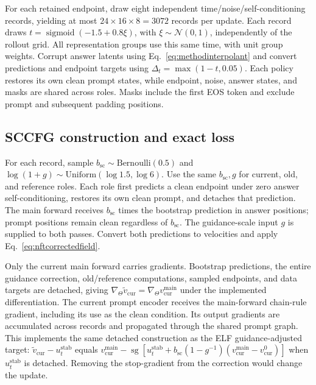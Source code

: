 \documentclass[11pt,letterpaper]{article}
\newcommand{\sg}{\operatorname{sg}}
\begin{document}
For each retained endpoint, draw eight independent time/noise/self-conditioning records, yielding at most $24\times16\times8=3072$ records per update. Each record draws $t=\operatorname{sigmoid}(-1.5+0.8\xi)$, with $\xi\sim\mathcal N(0,1)$, independently of the rollout grid. All representation groups use this same time, with unit group weights. Corrupt answer latents using Eq.~\eqref{eq:methodinterpolant} and convert predictions and endpoint targets using $\Delta_t=\max(1-t,0.05)$. Each policy restores its own clean prompt states, while endpoint, noise, answer states, and masks are shared across roles. Masks include the first EOS token and exclude prompt and subsequent padding positions.

\subsection{SCCFG construction and exact loss}

For each record, sample $b_{\mathrm{sc}}\sim\mathrm{Bernoulli}(0.5)$ and $\log(1+g)\sim\mathrm{Uniform}(\log1.5,\log6)$. Use the same $b_{\mathrm{sc}},g$ for current, old, and reference roles. Each role first predicts a clean endpoint under zero answer self-conditioning, restores its own clean prompt, and detaches that prediction. The main forward receives $b_{\mathrm{sc}}$ times the bootstrap prediction in answer positions; prompt positions remain clean regardless of $b_{\mathrm{sc}}$. The guidance-scale input $g$ is supplied to both passes. Convert both predictions to velocities and apply Eq.~\eqref{eq:nftcorrectedfield}.

Only the current main forward carries gradients. Bootstrap predictions, the entire guidance correction, old/reference computations, sampled endpoints, and data targets are detached, giving $\nabla_\Theta\widetilde v_{\mathrm{cur}}=\nabla_\Theta v_{\mathrm{cur}}^{\mathrm{main}}$ under the implemented differentiation. The current prompt encoder receives the main-forward chain-rule gradient, including its use as the clean condition. Its output gradients are accumulated across records and propagated through the shared prompt graph. This implements the same detached construction as the ELF guidance-adjusted target: $\widetilde v_{\mathrm{cur}}-u_t^{\mathrm{stab}}$ equals $v_{\mathrm{cur}}^{\mathrm{main}}-\sg[u_t^{\mathrm{stab}}+b_{\mathrm{sc}}(1-g^{-1})(v_{\mathrm{cur}}^{\mathrm{main}}-v_{\mathrm{cur}}^0)]$ when $u_t^{\mathrm{stab}}$ is detached. Removing the stop-gradient from the correction would change the update.
\end{document}
